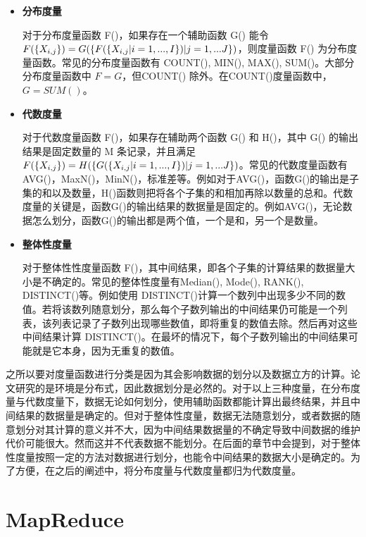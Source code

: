 \begin{itemize}

\item \textbf{分布度量}

对于分布度量函数 F()，如果存在一个辅助函数 G() 能令 $F(\text\{ {X}_{i,j} \text\}) = G(\text\{ F(\text\{ {X}_{i,j}|i=1,...,I \text\})|j=1,...J \text\})$，则度量函数 F() 为分布度量函数。常见的分布度量函数有 COUNT(), MIN(), MAX(), SUM()。大部分分布度量函数中 $F=G$，但COUNT() 除外。在COUNT()度量函数中，$G=SUM()$。

\item \textbf{代数度量}

对于代数度量函数 F()，如果存在辅助两个函数 G() 和 H()，其中 G() 的输出结果是固定数量的 M 条记录，并且满足$F(\text\{ {X}_{i,j} \text\}) = H(\text\{ G(\text\{ {X}_{i,j}|i=1,...,I \text\})|j=1,...J \text\})$。常见的代数度量函数有AVG()，MaxN()，MinN()，标准差等。例如对于AVG()，函数G()的输出是子集的和以及数量，H()函数则把将各个子集的和相加再除以数量的总和。代数度量的关键是，函数G()的输出结果的数据量是固定的。例如AVG()，无论数据怎么划分，函数G()的输出都是两个值，一个是和，另一个是数量。

\item \textbf{整体性度量}

对于整体性性度量函数 F()，其中间结果，即各个子集的计算结果的数据量大小是不确定的。常见的整体性度量有Median(), Mode(), RANK(), DISTINCT()等。例如使用 DISTINCT()计算一个数列中出现多少不同的数值。若将该数列随意划分，那么每个子数列输出的中间结果仍可能是一个列表，该列表记录了子数列出现哪些数值，即将重复的数值去除。然后再对这些中间结果计算 DISTINCT()。在最坏的情况下，每个子数列输出的中间结果可能就是它本身，因为无重复的数值。

\end{itemize}

之所以要对度量函数进行分类是因为其会影响数据的划分以及数据立方的计算。论文研究的是环境是分布式，因此数据划分是必然的。对于以上三种度量，在分布度量与代数度量下，数据无论如何划分，使用辅助函数都能计算出最终结果，并且中间结果的数据量是确定的。但对于整体性度量，数据无法随意划分，或者数据的随意划分对其计算的意义并不大，因为中间结果数据量的不确定导致中间数据的维护代价可能很大。然而这并不代表数据不能划分。在后面的章节中会提到，对于整体性度量按照一定的方法对数据进行划分，也能令中间结果的数据大小是确定的。为了方便，在之后的阐述中，将分布度量与代数度量都归为代数度量。

\section{MapReduce}

